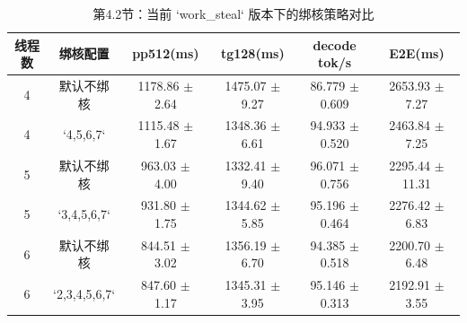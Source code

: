 \begin{table}[ht]
  \centering
  \caption{第4.2节：当前 `work_steal` 版本下的绑核策略对比}
  \label{tab:ws-pin-compare}
  \begin{tabular}{c c c c c c}
    \hline
    线程数 & 绑核配置 & pp512(ms) & tg128(ms) & decode tok/s & E2E(ms) \\
    \hline
    4 & 默认不绑核 & 1178.86 $\pm$ 2.64 & 1475.07 $\pm$ 9.27 & 86.779 $\pm$ 0.609 & 2653.93 $\pm$ 7.27 \\
    4 & `4,5,6,7` & 1115.48 $\pm$ 1.67 & 1348.36 $\pm$ 6.61 & 94.933 $\pm$ 0.520 & 2463.84 $\pm$ 7.25 \\
    5 & 默认不绑核 & 963.03 $\pm$ 4.00 & 1332.41 $\pm$ 9.40 & 96.071 $\pm$ 0.756 & 2295.44 $\pm$ 11.31 \\
    5 & `3,4,5,6,7` & 931.80 $\pm$ 1.75 & 1344.62 $\pm$ 5.85 & 95.196 $\pm$ 0.464 & 2276.42 $\pm$ 6.83 \\
    6 & 默认不绑核 & 844.51 $\pm$ 3.02 & 1356.19 $\pm$ 6.70 & 94.385 $\pm$ 0.518 & 2200.70 $\pm$ 6.48 \\
    6 & `2,3,4,5,6,7` & 847.60 $\pm$ 1.17 & 1345.31 $\pm$ 3.95 & 95.146 $\pm$ 0.313 & 2192.91 $\pm$ 3.55 \\
    \hline
  \end{tabular}
\end{table}
